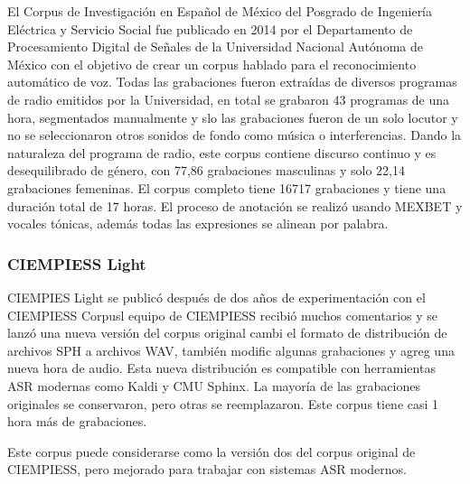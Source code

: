 El Corpus de Investigación en Español de México del Posgrado de Ingeniería Eléctrica y Servicio Social fue publicado en 2014 por el Departamento de Procesamiento Digital de Señales de la Universidad Nacional Autónoma de México\macb{\st{,}} con el objetivo de crear un corpus hablado para el reconocimiento automático de voz. Todas las grabaciones fueron extraídas de diversos programas de radio emitidos por la Universidad, en total se grabaron 43 programas de una hora, segmentados manualmente y slo las grabaciones fueron de un solo locutor y no se seleccionaron otros sonidos de fondo como música o interferencias. Dando la naturaleza del programa de radio, este corpus contiene discurso continuo y es desequilibrado de género, con 77,86 grabaciones masculinas y solo 22,14 grabaciones femeninas. El corpus completo tiene 16717 grabaciones y tiene una duración total de 17 horas. El proceso de anotación se realizó usando MEXBET y vocales tónicas, además todas las expresiones se alinean por palabra. 

\subsubsection{CIEMPIESS Light}

CIEMPIES Light se publicó después de dos años de experimentación con el CIEMPIESS Corpusl equipo de CIEMPIESS recibió muchos comentarios y se lanzó una nueva versión del corpus original cambi el formato de distribución de archivos SPH a archivos WAV, también  modific algunas grabaciones y  agreg  una nueva hora de audio. Esta nueva distribución es compatible con herramientas ASR modernas como Kaldi y CMU Sphinx. La mayoría de las grabaciones originales se conservaron, pero otras se reemplazaron. Este corpus tiene casi 1 hora más de grabaciones.

Este corpus puede considerarse como la versión dos del corpus original de CIEMPIESS, pero mejorado para trabajar con sistemas ASR modernos. 

